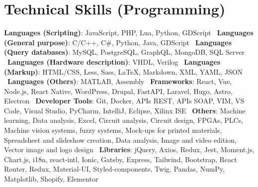\documentclass[letterpaper,11pt]{article}
\begin{document}
\section{Technical Skills (Programming)}
\begin{itemize}[leftmargin=0.15in, label={}]
  \small{\item{
    \textbf{Languages (Scripting)}{: JavaScript, PHP, Lua, Python, GDScript} \
    \textbf{Languages (General purpose)}{: C/C++, C\#, Python, Java, GDScript} \
    \textbf{Languages (Query databases)}{: MySQL, PostgreSQL, GraphQL, MongoDB, SQL Server} \
    \textbf{Languages (Hardware description)}{: VHDL, Verilog} \
    \textbf{Languages (Markup)}{: HTML/CSS, Less, Sass, LaTeX, Markdown, XML, YAML, JSON} \
    \textbf{Languages (Others)}{: MATLAB, Assembly} \
    \textbf{Frameworks}{: React, Vue, Node.js, React Native, WordPress, Drupal, FastAPI, Laravel, Hugo, Astro, Electron} \
    \textbf{Developer Tools}{: Git, Docker, APIs REST, APIs SOAP, VIM, VS Code, Visual Studio, PyCharm, IntelliJ, Eclipse, Xilinx ISE} \
    \textbf{Others}{: Machine learning, Data analysis, Excel, Circuit analysis, Circuit design, FPGAs, PLCs, Machine vision systems, fuzzy systems, Mock-ups for printed materials, Spreadsheet and slideshow creation, Data analysis, Image and video edition, Vector image and logo design} \
    \textbf{Libraries}{: jQuery, Axios, Redux, Jest, Moment.js, Chart.js, i18n, react-intl, Ionic, Gatsby, Express, Tailwind, Bootstrap, React Router, Redux, Material-UI, Styled-components, Twig, Pandas, NumPy, Matplotlib, Shopify, Elementor}
  }}
\end{itemize}

\end{document}
